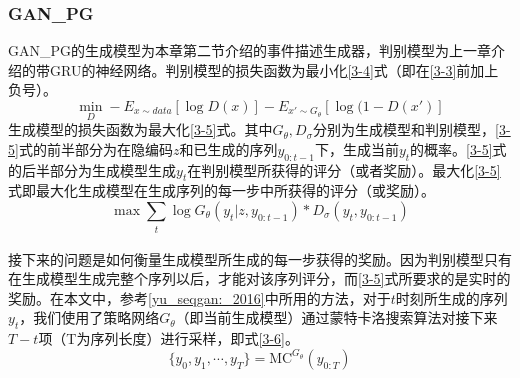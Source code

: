 \documentclass[]{template}
\begin{document}
\subsubsection{GAN\_PG}
GAN\_PG的生成模型为本章第二节介绍的事件描述生成器，判别模型为上一章介绍的带GRU的神经网络。判别模型的损失函数为最小化\ref{3-4}式（即在\ref{3-3}前加上负号）。
\begin{equation}\label{3-4}
    \mathop{min}_D-E_{x\sim data}[\log D(x)]-E_{x'\sim G_\theta}[\log(1-D(x')]
\end{equation}
生成模型的损失函数为最大化\ref{3-5}式。其中$G_\theta,D_\sigma$分别为生成模型和判别模型，\ref{3-5}式的前半部分为在隐编码$z$和已生成的序列$y_{0:t-1}$下，生成当前$y_t$的概率。\ref{3-5}式的后半部分为生成模型生成$y_t$在判别模型所获得的评分（或者奖励）。最大化\ref{3-5}式即最大化生成模型在生成序列的每一步中所获得的评分（或奖励）。
\begin{equation}\label{3-5}
\mathop{max}\sum_{\substack{t}}\log G_\theta (y_t|z,y_{0:t-1})*D_\sigma (y_t,y_{0:t-1})
\end{equation}

接下来的问题是如何衡量生成模型所生成的每一步获得的奖励。因为判别模型只有在生成模型生成完整个序列以后，才能对该序列评分，而\ref{3-5}式所要求的是实时的奖励。在本文中，参考\ref{yu_seqgan:_2016}中所用的方法，对于$t$时刻所生成的序列$y_t$，我们使用了策略网络$G_\theta$（即当前生成模型）通过蒙特卡洛搜索算法对接下来$T-t$项（T为序列长度）进行采样，即式\ref{3-6}。
\begin{equation}\label{3-6}
    \{y_0,y_1,\dotsb,y_T\}=\mathrm{MC}^{G_\theta}(y_{0:T})
\end{equation}
\end{document}
